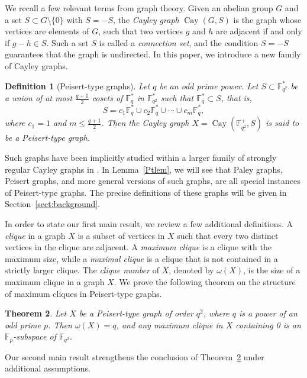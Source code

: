\documentclass[12pt,reqno]{amsart}
\newtheorem{thm}{Theorem}[section]
\newtheorem{defn}[thm]{Definition}
\theoremstyle{definition}
\newcommand{\F}{\mathbb{F}}
\begin{document}
We recall a few relevant terms from graph theory. Given an abelian group $G$ and a set $S \subset G \setminus \{0\}$ with $S=-S$, the {\em Cayley graph} $\operatorname{Cay}(G,S)$ is
the graph whose vertices are elements of $G$, such that two vertices $g$ and $h$ are adjacent if and only if $g-h \in S$. Such a set $S$ is called a {\em connection set}, and the condition $S=-S$ guarantees that the graph is undirected. In this paper, we introduce a new family of Cayley graphs. 

\begin{defn}[Peisert-type graphs]\label{defn:peisert-type}
Let $q$ be an odd prime power. Let $S \subset \F_{q^2}^*$ be a union of at most $\frac{q+1}{2}$ cosets of $\F_q^*$ in $\F_{q^2}^*$ such that $\F_q^* \subset S$, that is,
\begin{equation}\label{coset}
S=c_1\F_q^* \cup c_2\F_q^* \cup \cdots \cup c_m \F_q^*,   
\end{equation}
where $c_1=1$ and $m \leq \frac{q+1}{2}$. Then the Cayley graph $X=\operatorname{Cay}(\F_{q^2}^+, S)$ is said to be a Peisert-type graph.
\end{defn}

Such graphs have been implicitly studied within a larger family of strongly regular Cayley graphs in \cite{BWX99}. In Lemma~\ref{Ptlem}, we will see that Paley graphs, Peisert graphs, and more general versions of such graphs, are all special instances of Peisert-type graphs. The precise definitions of these graphs will be given in Section~\ref{sect:background}.

In order to state our first main result, we review a few additional definitions. A {\em clique} in a graph $X$ is a subset of vertices in $X$ such that every two distinct vertices in the clique are adjacent. A {\em maximum clique} is a clique with the maximum size, while a {\em maximal clique} is a clique that is not contained in a strictly larger clique. The {\em clique number} of $X$, denoted by $\omega (X)$, is the size of a maximum clique in a graph $X$. We prove the following theorem on the structure of maximum cliques in Peisert-type graphs.

\begin{thm} \label{subspacethm}
Let $X$ be a Peisert-type graph of order $q^2$, where $q$ is a power of an odd prime $p$. Then $\omega(X)= q$, and any maximum clique in $X$ containing 0 is an $\F_p$-subspace of $\F_{q^2}$. 
\end{thm}

Our second main result strengthens the conclusion of Theorem~\ref{subspacethm} under additional assumptions. 
\end{document}
